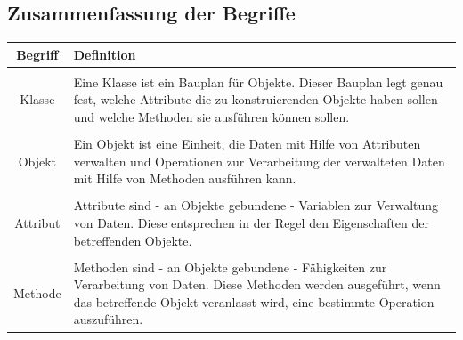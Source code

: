 \documentclass{scrartcl}   %
\begin{document}
\subsection{Zusammenfassung der Begriffe}

\begin{table}[ht]
\centering
\begin{tabular}{c|p{10cm}}
	\\Begriff & Definition\\
	\hline
	
	\\Klasse & Eine Klasse ist ein Bauplan für Objekte. Dieser Bauplan legt genau fest, welche Attribute die zu konstruierenden Objekte haben sollen und welche Methoden sie ausführen können sollen.\\
	
	\\Objekt & Ein Objekt ist eine Einheit, die Daten mit Hilfe von Attributen verwalten und Operationen zur Verarbeitung der verwalteten Daten mit Hilfe von Methoden ausführen kann.\\

	\\Attribut & Attribute sind - an Objekte gebundene - Variablen zur Verwaltung von Daten. Diese entsprechen in der Regel den Eigenschaften der betreffenden Objekte.\\

	\\Methode & Methoden sind - an Objekte gebundene - Fähigkeiten zur Verarbeitung von Daten. Diese Methoden werden ausgeführt, wenn das betreffende Objekt veranlasst wird, eine bestimmte Operation auszuführen.\\
\end{tabular}
\end{table}

\newpage
\end{document}
